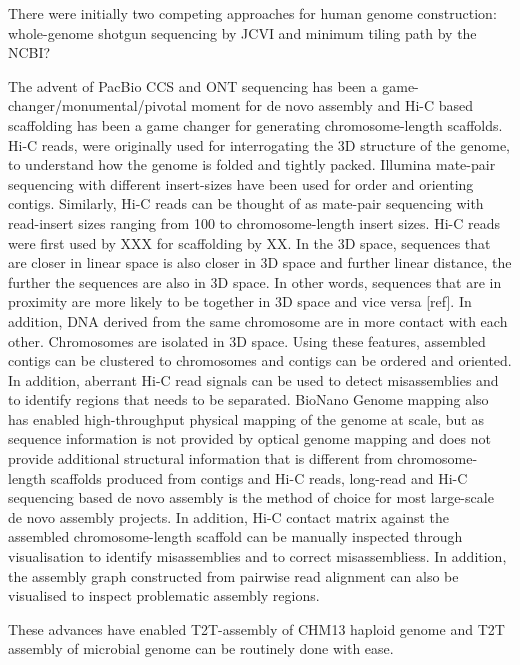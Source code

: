 There were initially two competing approaches for human genome construction: whole-genome shotgun sequencing by JCVI and minimum tiling path by the NCBI?


The advent of PacBio CCS and ONT sequencing has been a game-changer/monumental/pivotal moment for de novo assembly and Hi-C based scaffolding has been a game changer for generating chromosome-length scaffolds. Hi-C reads, were originally used for interrogating the 3D structure of the genome, to understand how the genome is folded and tightly packed. Illumina mate-pair sequencing with different insert-sizes have been used for order and orienting contigs. Similarly, Hi-C reads can be thought of as mate-pair sequencing with read-insert sizes ranging from 100 to chromosome-length insert sizes. Hi-C reads were first used by XXX for scaffolding by XX. In the 3D space, sequences that are closer in linear space is also closer in 3D space and further linear distance, the further the sequences are also in 3D space. In other words, sequences that are in proximity are more likely to be together in 3D space and vice versa [ref]. In addition, DNA derived from the same chromosome are in more contact with each other. Chromosomes are isolated in 3D space. Using these features, assembled contigs can be clustered to chromosomes and contigs can be ordered and oriented. In addition, aberrant Hi-C read signals can be used to detect misassemblies and to identify regions that needs to be separated. BioNano Genome mapping also has enabled high-throughput physical mapping of the genome at scale, but as sequence information is not provided by optical genome mapping and does not provide additional structural information that is different from chromosome-length scaffolds produced from contigs and Hi-C reads, long-read and Hi-C sequencing based de novo assembly is the method of choice for most large-scale de novo assembly projects. In addition, Hi-C contact matrix against the assembled chromosome-length scaffold can be manually inspected through visualisation to identify misassemblies and to correct misassembliess. In addition, the assembly graph constructed from pairwise read alignment can also be visualised to inspect problematic assembly regions. 

These advances have enabled T2T-assembly of CHM13 haploid genome and T2T assembly of microbial genome can be routinely done with ease. 

